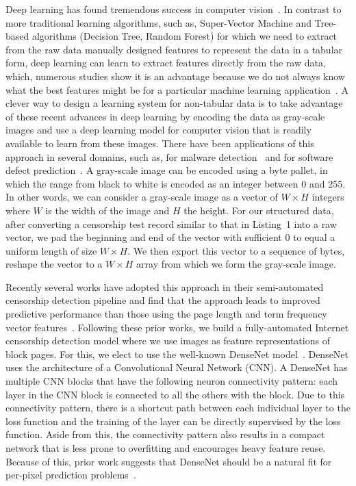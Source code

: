 Deep learning has found tremendous success in computer
vision~\cite{huang_densely_2017, li_fei-fei_imagenet_2012}. In contrast to 
more traditional learning algorithms, such as, Super-Vector Machine and 
Tree-based algorithms (Decision Tree, Random Forest) for which we need to
extract from the raw data manually designed features to represent the data
in a tabular form, deep learning can learn to extract features directly
from the raw data, which, numerous studies show it is an advantage because
we do not always know what the best features might be for a particular 
machine learning application~\cite{bengio2013representation}. 
A clever way to
design a learning system for non-tabular data is to take
advantage of these recent advances in deep learning by encoding the data as
gray-scale images and use a deep learning model for computer vision that is
readily available to learn
from these images. There have been applications of this approach in several
domains, such as, for malware detection~\cite{hemalatha_efficient_2021} and for
software defect prediction~\cite{chen2020software}.  A gray-scale image can be
encoded using a byte pallet, in which the range from black to white is encoded
as an integer between 0 and 255. In other words, we can consider a gray-scale
image as a vector of $W \times H$ integers where $W$ is the width of the image
and $H$ the height. For our structured data, after converting a
censorship test record similar to that in Listing~1 into a
raw vector, we pad the
beginning and end of the vector with sufficient 0 to 
equal a uniform length of size $W \times H$. We then export this vector to a
sequence of bytes, reshape the vector to a $W \times H$ array from which we
form the gray-scale image.

Recently several works
have adopted this approach in their semi-automated censorship detection
pipeline and find that the approach leads to improved predictive performance
than those using the page length and term frequency vector 
features~\cite{raman_measuring_2020, sundara_raman_censored_2020}. 
Following these prior works, we build a fully-automated Internet censorship detection model
where we use images as feature representations of block pages. For this,
we elect to use the well-known DenseNet
model~\cite{huang_densely_2017}.  DenseNet uses the architecture of a Convolutional
Neural Network (CNN). A DenseNet has multiple CNN blocks that have the
following neuron connectivity pattern: each layer in the CNN block
is connected to all the others with the block. Due to this connectivity
pattern, there is a shortcut path between each individual layer to the loss
function and the training of the layer can be directly supervised by the loss
function. Aside from this, the connectivity pattern also results in a compact
network that is less prone to overfitting and encourages heavy feature reuse.
Because of this, prior work suggests that DenseNet should be a natural fit for per-pixel
prediction problems~\cite{zhu2017densenet}.


